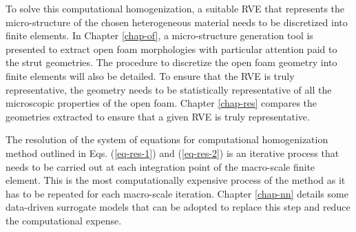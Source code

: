 To solve this \fee computational homogenization, a suitable RVE that represents the micro-structure of the chosen heterogeneous material needs to be discretized into finite elements. In Chapter \ref{chap-of}, a micro-structure generation tool is presented to extract open foam morphologies with particular attention paid to the strut geometries. The procedure to discretize the open foam geometry into finite elements will also be detailed. To ensure that the RVE is truly representative, the geometry needs to be statistically representative of all the microscopic properties of the open foam. Chapter \ref{chap-res} compares the geometries extracted to ensure that a given RVE is truly representative. 

The resolution of the system of equations for computational homogenization method outlined in Eqs. (\ref{eq-res-1}) and (\ref{eq-res-2}) is an iterative process that needs to be carried out at each integration point of the macro-scale finite element. This is the most computationally expensive process of the \fee method as it has to be repeated for each macro-scale iteration. Chapter \ref{chap-nn} details some data-driven surrogate models that can be adopted to replace this step and reduce the computational expense.
